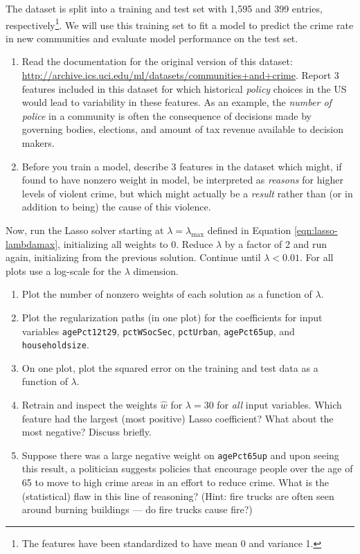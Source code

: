 \documentclass{article}
\begin{document}
\begin{aprob}
    The dataset is split into a training and test set with 1,595 and 399 entries, respectively\footnote{The features have been standardized to have mean 0 and variance 1.}.
    We will use this training set to fit a model to predict the crime rate in new communities and evaluate model performance on the test set.

    \begin{enumerate}
        \item {} Read the documentation for the original version of this dataset: \url{http://archive.ics.uci.edu/ml/datasets/communities+and+crime}. Report 3 features included in this dataset for which historical \emph{policy} choices in the US would lead to variability in these features. As an example, the \emph{number of police} in a community is often the consequence of decisions made by governing bodies, elections, and amount of tax revenue available to decision makers.
        \item {} Before you train a model, describe 3 features in the dataset which might, if found to have nonzero weight in model, be interpreted as \emph{reasons} for higher levels of violent crime, but which might actually be a \emph{result} rather than (or in addition to being) the cause of this violence.
    \end{enumerate}

    Now, run the Lasso solver starting at $\lambda = \lambda_{\max}$ defined in Equation \eqref{eqn:lasso-lambdamax}, initializing all weights to $0$. Reduce $\lambda$ by a factor of 2 and run again, initializing from the previous solution. Continue until $\lambda < 0.01$. For all plots use a log-scale for the $\lambda$ dimension.\\

    \begin{enumerate}
        \item[c.]  Plot the number of nonzero weights of each solution as a function of $\lambda$.
        \item[d.]  Plot the regularization paths (in one plot) for the coefficients for input variables \texttt{agePct12t29}, \texttt{pctWSocSec}, \texttt{pctUrban}, \texttt{agePct65up}, and \texttt{householdsize}.
        \item[e.]  On one plot, plot the squared error on the training and test data as a function of $\lambda$.
        \item[f.]  Retrain and inspect the weights $\hat{w}$ for $\lambda = 30$ for \textit{all} input variables. Which feature had the largest (most positive) Lasso coefficient? What about the most negative? Discuss briefly.
        \item[g.]  Suppose there was a large negative weight on \texttt{agePct65up} and upon seeing this result, a politician suggests policies that encourage people over the age of 65 to move to high crime areas in an effort to reduce crime. What is the (statistical) flaw in this line of reasoning? (Hint: fire trucks are often seen around burning buildings — do fire trucks cause fire?)
    \end{enumerate}


\end{aprob}
\end{document}
